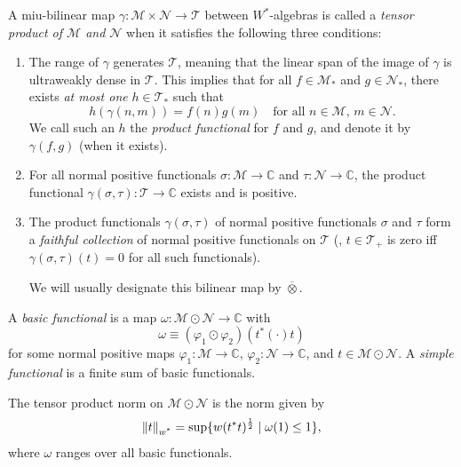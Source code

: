 \begin{definition}
  A miu-bilinear map \( \gamma: \mathscr{M} \times \mathscr{N} \to \mathscr{T} \) between $W^*$-algebras is called a \emph{tensor product of \( \mathscr{M} \) and \( \mathscr{N} \)} when it satisfies the following three conditions:

\begin{enumerate}
    \item The range of \( \gamma \) generates \( \mathscr{T} \), meaning that the linear span of the image of \( \gamma \) is ultraweakly dense in \( \mathscr{T} \). This implies that for all \( f \in \mathscr{M}_* \) and \( g \in \mathscr{N}_* \), there exists \emph{at most one} \( h \in \mathscr{T}_* \) such that
    \[
    h(\gamma(n, m)) = f(n) g(m) \quad \text{for all } n \in \mathscr{M}, \, m \in \mathscr{N}.
    \]
    We call such an \( h \) the \emph{product functional} for \( f \) and \( g \), and denote it by \( \gamma(f, g) \) (when it exists).

    \item For all normal positive functionals \( \sigma: \mathscr{M} \to \mathbb{C} \) and \( \tau: \mathscr{N} \to \mathbb{C} \), the product functional \( \gamma(\sigma, \tau): \mathscr{T} \to \mathbb{C} \) exists and is positive.

    \item The product functionals \( \gamma(\sigma, \tau) \) of normal positive functionals \( \sigma \) and \( \tau \) form a \emph{faithful collection} of normal positive functionals on \( \mathscr{T} \) (\ie, \( t \in \mathscr{T}_+ \) is zero iff \( \gamma(\sigma, \tau)(t) = 0 \) for all such functionals).

We will usually designate this bilinear map by $\overline{\otimes}$.
\end{enumerate}
\end{definition}

\begin{definition}
  A \emph{basic functional} is a map $\omega: \mathscr{M} \odot \mathscr{N} \to \mathbb{C}$ with
\[
\omega \equiv (\varphi_1 \odot \varphi_2)(t^{*}(\cdot)t)
\]
for some normal positive maps $\varphi_1: \mathscr{M} \to \mathbb{C}$, $\varphi_2: \mathscr{N} \to \mathbb{C}$, and $t \in \mathscr{M} \odot \mathscr{N}$. A \emph{simple functional} is a finite sum of basic functionals.
\end{definition}

\begin{definition}
  The tensor product norm on $\mathscr{M} \odot \mathscr{N}$ is the norm  given by
\[
\left\lVert t \right\rVert_{\text{$w^*$}} = \sup \{ w(t^*t)^{\frac{1}{2}} \mid \omega(1) \leq 1 \},
\]
where $\omega$ ranges over all basic functionals.
\end{definition}


